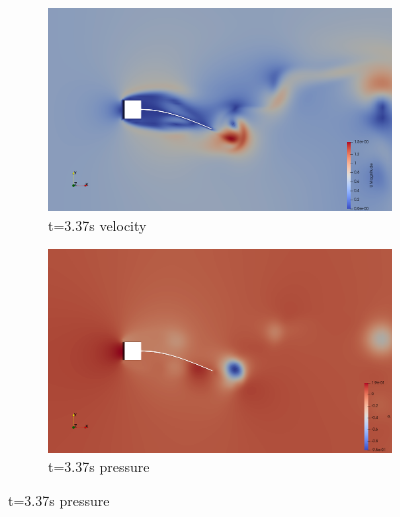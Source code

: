 \begin{figure}[htb]
\centering %
\begin{subfigure}{0.5\textwidth}
  \includegraphics[width=\linewidth]{images/sq-cyl/sq_v1.png}
  \caption{t=3.37s velocity}
  \label{fig:sq_v1}
\end{subfigure}\hfil %
\begin{subfigure}{0.5\textwidth}
  \includegraphics[width=\linewidth]{images/sq-cyl/sq_p1.png}
  \caption{t=3.37s pressure}
  \label{fig:sq_p1}
\end{subfigure}\hfil %

\medskip


\end{figure}
